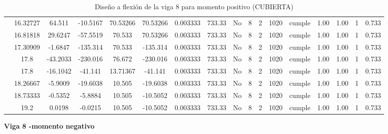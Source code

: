 \begin{table}[H]
{\begin{tabular}{|c|c|c|c|c|c|c|c|c|c|c|c|c|c|c|c|c|}
\cline{2-17}    & 16.32727 & 64.511 & -10.5167 & 70.53266 & 70.53266 & 0.003333 & 733.33 & No  & 8   & 2   & 1020 & \cellcolor[rgb]{ .776,  .937,  .808}cumple & 1.00 & 1.00 & 1   & 0.733 \bigstrut\\
\cline{2-17}    & 16.81818 & 29.6247 & -57.5519 & 70.533 & 70.53266 & 0.003333 & 733.33 & No  & 8   & 2   & 1020 & \cellcolor[rgb]{ .776,  .937,  .808}cumple & 1.00 & 1.00 & 1   & 0.733 \bigstrut\\
\cline{2-17}    & 17.30909 & -1.6847 & -135.314 & 70.533 & -135.314 & 0.003333 & 733.33 & No  & 8   & 2   & 1020 & \cellcolor[rgb]{ .776,  .937,  .808}cumple & 1.00 & 1.00 & 1   & 0.733 \bigstrut\\
\cline{2-17}    & \cellcolor[rgb]{ .851,  .882,  .949}17.8 & -43.2033 & -230.016 & 76.672 & -230.016 & 0.003333 & 733.33 & No  & 8   & 2   & 1020 & \cellcolor[rgb]{ .776,  .937,  .808}cumple & 1.00 & 1.00 & 1   & 0.733 \bigstrut\\
\cline{2-17}    & \cellcolor[rgb]{ .851,  .882,  .949}17.8 & -16.1042 & -41.141 & 13.71367 & -41.141 & 0.003333 & 733.33 & No  & 8   & 2   & 1020 & \cellcolor[rgb]{ .776,  .937,  .808}cumple & 1.00 & 1.00 & 1   & 0.733 \bigstrut\\
\cline{2-17}    & 18.26667 & -5.9009 & -19.6038 & 10.505 & -19.6038 & 0.003333 & 733.33 & No  & 8   & 2   & 1020 & \cellcolor[rgb]{ .776,  .937,  .808}cumple & 1.00 & 1.00 & 1   & 0.733 \bigstrut\\
\cline{2-17}    & 18.73333 & -0.5352 & -5.8884 & 10.505 & -10.5052 & 0.003333 & 733.33 & No  & 8   & 2   & 1020 & \cellcolor[rgb]{ .776,  .937,  .808}cumple & 1.00 & 1.00 & 1   & 0.733 \bigstrut\\
\cline{2-17}    & 19.2 & 0.0198 & -0.0215 & 10.505 & -10.5052 & 0.003333 & 733.33 & No  & 8   & 2   & 1020 & \cellcolor[rgb]{ .776,  .937,  .808}cumple & 1.00 & 1.00 & 1   & 0.733 \bigstrut\\
\hline
\end{tabular}%



  }%
    \caption{Diseño a flexión de la viga 8 para momento positivo (CUBIERTA) }
  \label{tab:F VG8 CUB M+}%
\end{table}%
\newpage
\textbf{Viga 8 -momento negativo}
